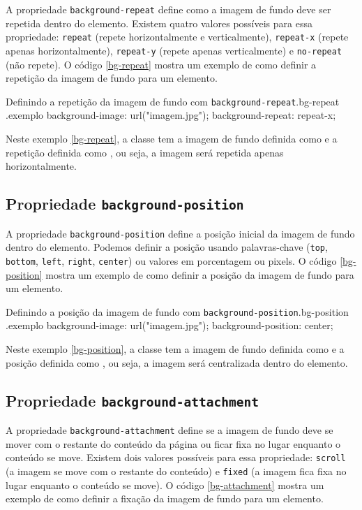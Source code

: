 A propriedade \texttt{background-repeat} define como a imagem de fundo deve ser repetida dentro do elemento. Existem quatro valores possíveis para essa propriedade: \texttt{repeat} (repete horizontalmente e verticalmente), \texttt{repeat-x} (repete apenas horizontalmente), \texttt{repeat-y} (repete apenas verticalmente) e \texttt{no-repeat} (não repete). O código \ref{bg-repeat} mostra um exemplo de como definir a repetição da imagem de fundo para um elemento.

\begin{csscode}{Definindo a repetição da imagem de fundo com \texttt{background-repeat}.}{bg-repeat}
.exemplo {
    background-image: url("imagem.jpg");
    background-repeat: repeat-x;
}
\end{csscode}

Neste exemplo \ref{bg-repeat}, a classe  tem a imagem de fundo definida como  e a repetição definida como , ou seja, a imagem será repetida apenas horizontalmente.

\subsection{Propriedade \texttt{background-position}}

A propriedade \texttt{background-position} define a posição inicial da imagem de fundo dentro do elemento. Podemos definir a posição usando palavras-chave (\texttt{top}, \texttt{bottom}, \texttt{left}, \texttt{right}, \texttt{center}) ou valores em porcentagem ou pixels. O código \ref{bg-position} mostra um exemplo de como definir a posição da imagem de fundo para um elemento.

\begin{csscode}{Definindo a posição da imagem de fundo com \texttt{background-position}.}{bg-position}
.exemplo {
    background-image: url("imagem.jpg");
    background-position: center;
}
\end{csscode}

Neste exemplo \ref{bg-position}, a classe  tem a imagem de fundo definida como  e a posição definida como , ou seja, a imagem será centralizada dentro do elemento.

\subsection{Propriedade \texttt{background-attachment}}

A propriedade \texttt{background-attachment} define se a imagem de fundo deve se mover com o restante do conteúdo da página ou ficar fixa no lugar enquanto o conteúdo se move. Existem dois valores possíveis para essa propriedade: \texttt{scroll} (a imagem se move com o restante do conteúdo) e \texttt{fixed} (a imagem fica fixa no lugar enquanto o conteúdo se move). O código \ref{bg-attachment} mostra um exemplo de como definir a fixação da imagem de fundo para um elemento.

